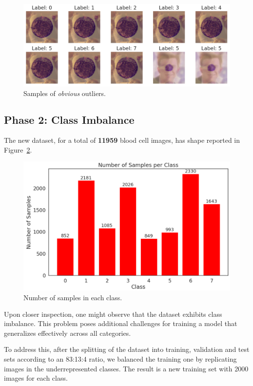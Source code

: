 \documentclass[11pt]{article}
\begin{document}
\begin{multicols*}{2}
        \begin{figure}[H]
            \centering
            \includegraphics[width=\linewidth]{figures/SCR-20241122-oigg.png}
            \caption{Samples of \textit{obvious} outliers.}
            \label{fig:rickroll}
        \end{figure}

        \subsection{Phase 2: Class Imbalance}

        The new dataset, for a total of \textbf{11959} blood cell images, has shape reported in Figure~\ref{fig:imbalance}.

        \begin{figure}[H]
            \centering
            \includegraphics[width=0.75\linewidth]{figures/SCR-20241122-ooty.png}
            \caption{Number of samples in each class.}
            \label{fig:imbalance}
        \end{figure} 

        Upon closer inspection, one might observe that the dataset exhibits class imbalance. This problem poses additional challenges for training a model that generalizes effectively across all categories.

        To address this, after the splitting of the dataset into training, validation and test sets according to an 83:13:4 ratio, we balanced the training one by replicating images in the underrepresented classes. The result is a new training set with 2000 images for each class.


\end{multicols*}
\end{document}

